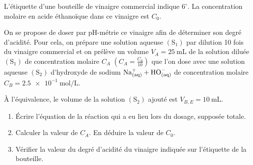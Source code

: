 L'étiquette d'une bouteille de vinaigre commercial indique $6^{\circ}$. La
concentration molaire en acide éthanoïque dans ce vinaigre est $C_{0}$.

On se propose de doser par pH-métrie ce vinaigre afin de déterminer son degré
d'acidité. Pour cela, on prépare une solution aqueuse $\mathrm{(S_{1})}$ par
dilution 10 fois du vinaigre commercial et on prélève un volume
${V_{A}=\qty{25}{\mL}}$ de la solution diluée $\mathrm{(S_{1})}$ de concentration
molaire $C_{A}$ $\left(C_{A}=\frac{C_{0}}{10}\right)$ que l'on dose avec une
solution aqueuse $\mathrm{(S_{2})}$ d'hydroxyde de sodium
$\ce{Na^{+}_{(aq)} + HO^{-}_{(aq)}}$ de concentration molaire
$C_{B}=\qty{2.5e-1}{\mol\per\L}$.

À l'équivalence, le volume de la solution $\mathrm{(S_{2})}$ ajouté est
$V_{B,E}=\qty{10}{\mL}$.

\begin{enumerate}
    \item Écrire l'équation de la réaction qui a eu lieu lors du dosage,
          supposée totale.
    \item Calculer la valeur de $C_{A}$. En déduire la valeur de $C_{0}$.
    \item Vérifier la valeur du degré d'acidité du vinaigre indiquée sur
          l'étiquette de la bouteille.
\end{enumerate}
